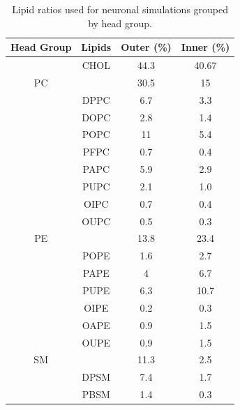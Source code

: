 \documentclass[9pt]{article}
\begin{document}
\renewcommand{\thetable}{SI 1}
\begin{table}
    \caption{Lipid ratios used for neuronal simulations grouped by head group.}
    \label{tab:rats}
    \centering

\begin{tabular}{|c||c|cc|}

\hline
Head Group & Lipids & Outer (\%) &{Inner (\%)} \\ \hline\hline
{}&CHOL                         & 44.3     & 40.67                         \\
\hline
PC &{} &30.5&15\\ \hline
{} &DPPC                         & 6.7      & 3.3                           \\
{} &DOPC                         & 2.8      & 1.4                           \\
{} &POPC                         & 11     & 5.4                         \\
{} &PFPC                         & 0.7      & 0.4                           \\
{} &PAPC                         & 5.9      & 2.9                           \\
{} &PUPC                         & 2.1      & 1.0                           \\
{} &OIPC                         & 0.7      & 0.4                           \\
{} &OUPC                         & 0.5      & 0.3                           \\
\hline
\hline
PE &{} &13.8&23.4\\ \hline
{} &POPE                         & 1.6      & 2.7                           \\
{} &PAPE                         & 4      & 6.7                           \\
{} &PUPE                         & 6.3      & 10.7                          \\
{} &OIPE                         & 0.2      & 0.3                           \\
{} &OAPE                         & 0.9      & 1.5                           \\
{} &OUPE                         & 0.9      & 1.5                          \\
\hline
\hline
SM &{} &11.3&2.5\\ \hline
{} &DPSM                         & 7.4      & 1.7                           \\
{} &PBSM                         & 1.4      & 0.3                           \\

\end{tabular}
\end{table}
\end{document}

